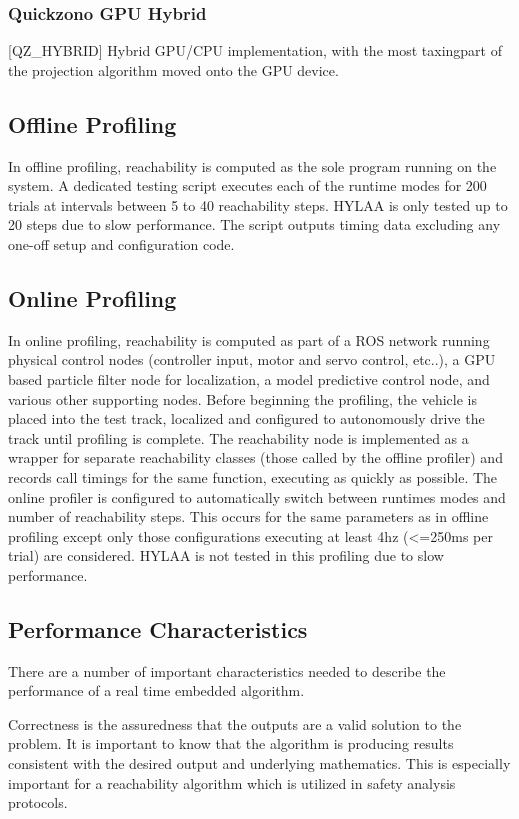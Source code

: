 \documentclass[runningheads]{llncs}
\begin{document}
\subsubsection{Quickzono GPU Hybrid} [QZ\_HYBRID] \newline Hybrid GPU/CPU implementation, with the most taxing\newline part of the projection algorithm moved onto the GPU device. 
\vspace*{-5pt}

\subsection{Offline Profiling}
In offline profiling, reachability is computed as the sole program running on the system. A dedicated testing script executes each of the runtime modes for 200 trials at intervals between 5 to 40 reachability steps. HYLAA is only tested up to 20 steps due to slow performance. The script outputs timing data excluding any one-off setup and configuration code.
\subsection{Online Profiling}
In online profiling, reachability is computed as part of a ROS network running physical control nodes (controller input, motor and servo control, etc..), a GPU based particle filter node for localization, a model predictive control node, and various other supporting nodes. Before beginning the profiling, the vehicle is placed into the test track, localized and configured to autonomously drive the track until profiling is complete. The reachability node is implemented as a wrapper for separate reachability classes (those called by the offline profiler) and records call timings for the same function, executing as quickly as possible. The online profiler is configured to automatically switch between runtimes modes and number of reachability steps. This occurs for the same parameters as in offline profiling except only those configurations executing at least 4hz (<=250ms per trial) are considered. HYLAA is not tested in this profiling due to slow performance.
\subsection{Performance Characteristics}
There are a number of important characteristics needed to describe the performance of a real time embedded algorithm.

Correctness is the assuredness that the outputs are a valid solution to the problem. It is important to know that the algorithm is producing results consistent with the desired output and underlying mathematics. This is especially important for a reachability algorithm which is utilized in safety analysis protocols.
\end{document}
